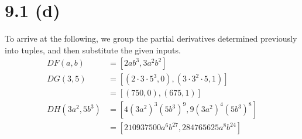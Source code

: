 \documentclass{article}
\begin{document}
\section*{9.1 (d)}

To arrive at the following, we group the partial derivatives
determined previously into tuples, and then substitute the given
inputs.
\begin{align*}
  DF(a, b) &= [2 a b^3, 3 a^2 b^2] \\
  DG(3, 5) &= [(2 \cdot 3 \cdot 5^3, 0), (3 \cdot 3^2 \cdot 5, 1)] \\
           &= [(750, 0), (675, 1)] \\
  DH(3 a^2, 5 b^3) &= [4 (3 a^2)^3 (5 b^3)^9, 9 (3 a^2)^4 (5 b^3)^8] \\
                   &= [210937500 a^6 b^{27}, 284765625 a^8 b^{24}]
\end{align*}
\end{document}
